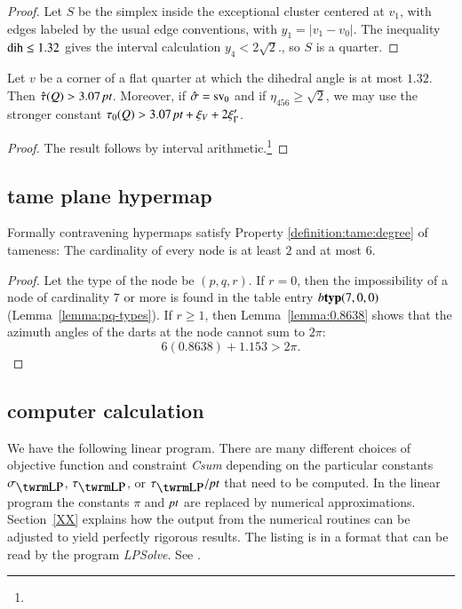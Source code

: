 \begin{proof} Let $S$ be the simplex inside the exceptional
cluster centered at $v_1$, with edges labeled by the usual edge
conventions, with $y_1=|v_1-v_0|$. The inequality $\operatorname{dih}\le 1.32$
gives the interval calculation 
$y_4< 2\sqrt{2}$., so $S$ is a quarter.
\end{proof}



\begin{lemma}
Let $v$ be a corner of a flat quarter at which the
dihedral angle is at most $1.32$. 
Then $\hat\tau(Q)>3.07\,\hbox{\it pt}$. Moreover, if $\hat\sigma={\operatorname{sv}}_0$ and if
$\eta_{456}\ge\sqrt2$, 
we may use the stronger constant
$\tau_0(Q)> 3.07\,\hbox{\it pt}+\xi_V+2\xi_\Gamma'$.
\end{lemma}


\begin{proof}
The result follows by
interval arithmetic.\footnote{} %
\end{proof}

\subsection{tame plane hypermap}


\begin{lemma}\label{a:6} 
Formally contravening hypermaps satisfy Property
\ref{definition:tame:degree} of tameness: The cardinality of every
node is at least $2$ and at most $6$.
\end{lemma}

\begin{proof}
Let the type of the node be $(p,q,r)$.  If $r=0$, then the
impossibility of a node of cardinality $7$ or more is found in the
table entry $b{\operatorname{\bf typ}}{(7,0,0)}$ (Lemma~\ref{lemma:pq-types}). If $r\ge1$,
then Lemma~\ref{lemma:0.8638} shows that the azimuth angles of the
darts at the node cannot sum to $2\pi$:
    $$6 (0.8638) + 1.153 > 2\pi.$$
\end{proof}




\subsection{computer calculation}
\label{sec:ccc}

We have the following linear program. There are many different
choices of objective function and constraint {\it Csum} depending on
the particular constants $\sLP$, $\tauLP$, or $\tlp/\pt$ that need
to be computed.  In the linear program the constants $\pi$ and $\hbox{\it pt}$
are replaced by numerical approximations.  Section~\ref{XX} explains
how the output from the numerical routines can be adjusted to yield
perfectly rigorous results.  The listing is in a format that can be
read by the program {\it LPSolve}.  See \cite{lpsolve}.

